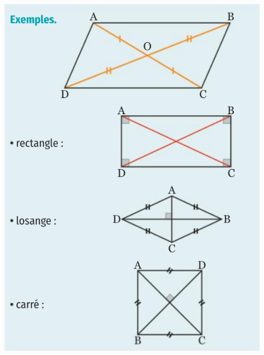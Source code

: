\documentclass[11pt]{article}
\begin{document}
\begin{minipage}{.5\textwidth}
\includegraphics[scale=.4]{quadri.png}
\end{minipage}
\end{document}
